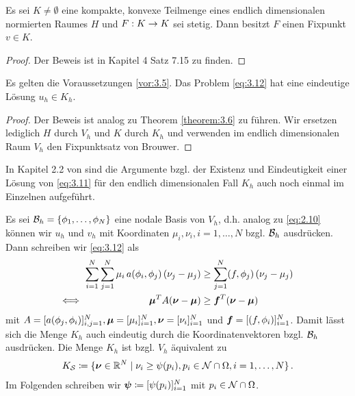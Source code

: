 \begin{satz}\label{satz:3.9}
Es sei $K \not= \emptyset$ eine kompakte, konvexe Teilmenge eines endlich dimensionalen normierten Raumes $H$ und $F: K \rightarrow K$ sei stetig. Dann besitzt $F$ einen Fixpunkt $v \in K$.
\end{satz}

\begin{proof}
Der Beweis ist in \cite{Werner} Kapitel 4 Satz 7.15 zu finden.
\end{proof}

\begin{theorem}\label{theorem:3.10}
Es gelten die Voraussetzungen \ref{vor:3.5}. Das Problem \eqref{eq:3.12} hat eine eindeutige Lösung $u_h \in K_h$.
\end{theorem}

\begin{proof}
Der Beweis ist analog zu Theorem \ref{theorem:3.6} zu führen. Wir ersetzen lediglich $H$ durch $V_h$ und $K$ durch $K_h$ und verwenden im endlich dimensionalen Raum $V_h$ den Fixpunktsatz von Brouwer.
\end{proof}


 \begin{bem*}
In Kapitel 2.2 von \cite{StarkePDE} sind die Argumente bzgl. der Existenz und Eindeutigkeit einer Lösung von \eqref{eq:3.11} für den endlich dimensionalen Fall $K_h$ auch noch einmal im Einzelnen aufgeführt.
\end{bem*}

Es sei $\mathcal B_h = \{\phi_1,\ldots,\phi_N\}$ eine nodale Basis von $V_h$, d.h. analog zu \eqref{eq:2.10} können wir $u_h$ und $v_h$ mit Koordinaten $\mu_i,\nu_i, i = 1,\ldots,N$ bzgl. $\mathcal B_h$ ausdrücken. Dann schreiben wir \eqref{eq:3.12} als
\begin{align*}
	\sum_{i = 1}^N\sum_{j=1}^N \mu_i \, a(\phi_i,\phi_j)\, (\nu_j-\mu_j) & \ge \sum_{j=1}^N  (f,\phi_j) \, (\nu_j-\mu_j)  \\
	\Longleftrightarrow\quad \qquad  \qquad \qquad \boldsymbol \mu^T A (\boldsymbol \nu- \boldsymbol\mu) &  \ge \boldsymbol f^T (\boldsymbol \nu-\boldsymbol \mu)
\end{align*}
mit $A = [a(\phi_j,\phi_i)]_{i,j=1}^N, \boldsymbol \mu = [\mu_i]_{i=1}^N,\boldsymbol \nu = [\nu_i]_{i=1}^N$ und $\boldsymbol f = [(f,\phi_i)]_{i=1}^N$. Damit lässt sich die Menge $K_h$ auch eindeutig durch die Koordinatenvektoren bzgl. $\mathcal B_h$ ausdrücken. Die Menge $K_h$ ist bzgl. $V_h$ äquivalent zu
\begin{align}\label{eq:3.13}
	K_{\mathcal S} \coloneqq \{\boldsymbol \nu \in \mathbb{R}^N \mid \nu_i \ge \psi(p_i) , p_i \in \mathcal N \cap \Omega, i = 1,\ldots, N \} \, .
\end{align}
Im Folgenden schreiben wir $\boldsymbol \psi \coloneqq [\psi(p_i)]_{i=1}^N$ mit $p_i \in \mathcal N\cap \Omega$.


